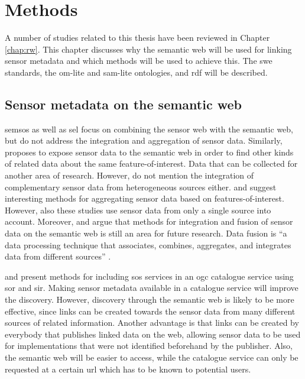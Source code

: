 

\section{Methods}
\label{chap:methods}

A number of studies related to this thesis have been reviewed in Chapter \ref{chap:rw}. This chapter discusses why the semantic web will be used for linking sensor metadata and which methods will be used to achieve this. The \ac{swe} standards, the om-lite and sam-lite ontologies, and \ac{rdf} will be described.  

\subsection{Sensor metadata on the semantic web}
\ac{semsos} \citep{SSW:Henson, SSW:Pschorr} as well as \ac{sel} \citep{SSW:Janowicz} focus on combining the sensor web with the semantic web, but do not address the integration and aggregation of sensor data. Similarly, \cite{SSW:Atkinson} proposes to expose sensor data to the semantic web in order to find other kinds of related data about the same feature-of-interest. Data that can be collected for another area of research. However, \cite{SSW:Atkinson} do not mention the integration of complementary sensor data from heterogeneous sources either. \cite{SSW:Stasch} and \cite{SSW:Stasch3} suggest interesting methods for aggregating sensor data based on features-of-interest. However, also these studies use sensor data from only a single source into account. Moreover, \cite{SSW:Corcho} and \cite{SSW:Ji} argue that methods for integration and fusion of sensor data on the semantic web is still an area for future research. Data fusion is \enquote{a data processing technique that associates, combines, aggregates, and integrates data from different sources} \cite[p. 2]{SSW:Wang2}. 

\cite{SW:OGC3} and \cite{SW:OGC4} present methods for including \ac{sos} services in an \ac{ogc} catalogue service using \ac{sor} and \ac{sir}. Making sensor metadata available in a catalogue service will improve the discovery. However, discovery through the semantic web is likely to be more effective, since links can be created towards the sensor data from many different sources of related information. Another advantage is that links can be created by everybody that publishes linked data on the web, allowing sensor data to be used for implementations that were not identified beforehand by the publisher. Also, the semantic web will be easier to access, while the catalogue service can only be requested at a certain \ac{url} which has to be known to potential users. 


